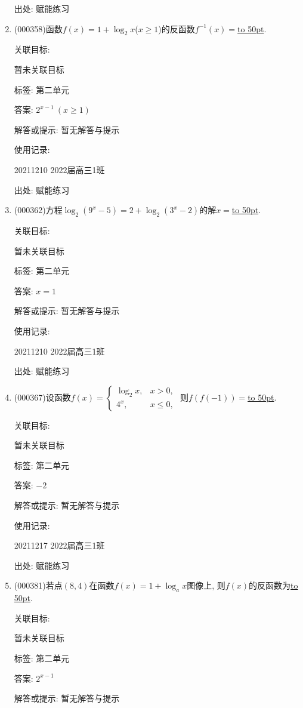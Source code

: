 \documentclass[10pt,a4paper]{article}
\newcommand{\blank}[1]{\underline{\hbox to #1pt{}}}
\begin{document}
\begin{enumerate}[1.]
出处: 赋能练习
\item { (000358)}函数$f(x)=1+\log_2 x$($x\ge 1$)的反函数$f^{-1}(x)=$\blank{50}.


关联目标:

暂未关联目标



标签: 第二单元

答案: $2^{x-1}\ (x\ge 1)$

解答或提示: 暂无解答与提示

使用记录:

20211210	2022届高三1班	


出处: 赋能练习
\item { (000362)}方程$\log_2(9^x-5)=2+\log_2(3^x-2)$的解$x=$\blank{50}.


关联目标:

暂未关联目标



标签: 第二单元

答案: $x=1$

解答或提示: 暂无解答与提示

使用记录:

20211210	2022届高三1班	


出处: 赋能练习
\item { (000367)}设函数$f(x)=\begin{cases}\log_2 x, & x>0, \\ 4^x, & x\le 0,\end{cases}$ 则$f(f(-1))=$\blank{50}.


关联目标:

暂未关联目标



标签: 第二单元

答案: $-2$

解答或提示: 暂无解答与提示

使用记录:

20211217	2022届高三1班	


出处: 赋能练习
\item { (000381)}若点$(8,4)$在函数$f(x)=1+\log_a x$图像上, 则$f(x)$的反函数为\blank{50}.


关联目标:

暂未关联目标



标签: 第二单元

答案: $2^{x-1}$

解答或提示: 暂无解答与提示


\end{enumerate}
\end{document}

